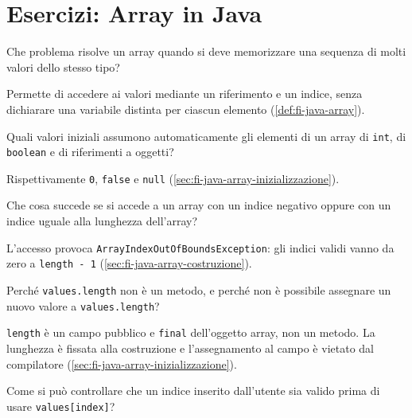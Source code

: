 \chapter{Esercizi: Array in Java}
\label{chap:esercizi-array-java}

\begin{exercise}
\label{ex:fi-esercizi-array-funzione}
Che problema risolve un array quando si deve memorizzare una sequenza
di molti valori dello stesso tipo?
\end{exercise}

Permette di accedere ai valori mediante un riferimento e un indice,
senza dichiarare una variabile distinta per ciascun elemento
(\cref{def:fi-java-array}).

\begin{exercise}
\label{ex:fi-esercizi-array-default}
Quali valori iniziali assumono automaticamente gli elementi di un
array di \texttt{int}, di \texttt{boolean} e di riferimenti a oggetti?
\end{exercise}

Rispettivamente \texttt{0}, \texttt{false} e \texttt{null}
(\cref{sec:fi-java-array-inizializzazione}).

\begin{exercise}
\label{ex:fi-esercizi-array-indici}
Che cosa succede se si accede a un array con un indice negativo
oppure con un indice uguale alla lunghezza dell'array?
\end{exercise}

L'accesso provoca \texttt{ArrayIndexOutOfBoundsException}:
gli indici validi vanno da zero a \texttt{length - 1}
(\cref{sec:fi-java-array-costruzione}).

\begin{exercise}
\label{ex:fi-esercizi-array-length}
Perché \texttt{values.length} non è un metodo, e perché non è
possibile assegnare un nuovo valore a \texttt{values.length}?
\end{exercise}

\texttt{length} è un campo pubblico e \texttt{final} dell'oggetto
array, non un metodo. La lunghezza è fissata alla costruzione
e l'assegnamento al campo è vietato dal compilatore
(\cref{sec:fi-java-array-inizializzazione}).

\begin{exercise}
\label{ex:fi-esercizi-array-validazione}
Come si può controllare che un indice inserito dall'utente sia
valido prima di usare \texttt{values[index]}?
\end{exercise}


